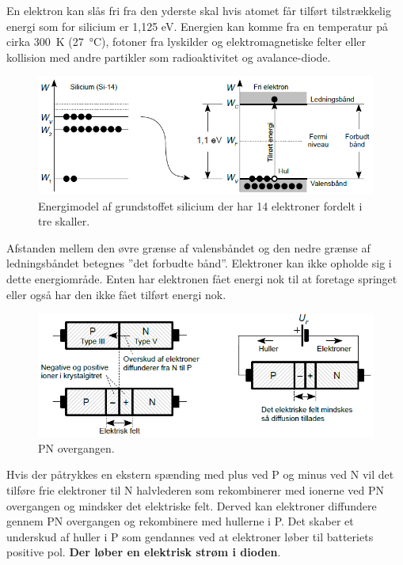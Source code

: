 \documentclass[danish]{article}
\begin{document}
En elektron kan slås fri fra den yderste skal hvis atomet får tilført tilstrækkelig energi som for silicium er 1,125 eV.
Energien kan komme fra en temperatur på cirka \SI{300}{\kelvin} (\SI{27}{\degreeCelsius}), fotoner fra lyskilder og elektromagnetiske felter eller kollision med andre partikler som radioaktivitet og avalance-diode.

\begin{figure} [H]
	\centering
	\includegraphics[width=\linewidth]{graphics/energimodel}
	\caption{Energimodel af grundstoffet silicium der har 14 elektroner fordelt i tre skaller.}
	\label{fig:energimodel}
\end{figure}

Afstanden mellem den øvre grænse af valensbåndet og den nedre grænse af ledningsbåndet betegnes ”det forbudte bånd”. Elektroner kan ikke opholde sig i dette energiområde.
Enten har elektronen fået energi nok til at foretage springet eller også har den ikke fået tilført energi nok.

\begin{figure} [H]
	\centering
	\includegraphics[width=\linewidth]{graphics/PN_overgang}
	\caption{PN overgangen.}
	\label{fig:pnovergang}
\end{figure}

Hvis der påtrykkes en ekstern spænding med plus ved P og minus ved N vil det tilføre frie elektroner til N halvlederen som rekombinerer med ionerne ved PN overgangen og mindsker det elektriske felt.
Derved kan elektroner diffundere gennem PN overgangen og rekombinere med hullerne i P. Det skaber et underskud af huller i P som gendannes ved at elektroner løber til batteriets positive pol. \textbf{Der løber en elektrisk strøm i dioden}. \\
\end{document}

